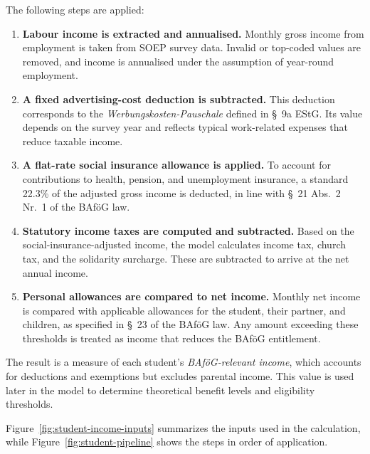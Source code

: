 \medskip
\noindent
The following steps are applied:

\begin{enumerate}
  \item \textbf{Labour income is extracted and annualised.}  
  Monthly gross income from employment is taken from SOEP survey data. Invalid or top-coded values are removed, and income is annualised under the assumption of year-round employment.

  \item \textbf{A fixed advertising-cost deduction is subtracted.}  
  This deduction corresponds to the \emph{Wer\-bungskosten-Pauschale} defined in §~9a EStG. Its value depends on the survey year and reflects typical work-related expenses that reduce taxable income.

  \item \textbf{A flat-rate social insurance allowance is applied.}  
  To account for contributions to health, pension, and unemployment insurance, a standard 22.3\% of the adjusted gross income is deducted, in line with §~21 Abs.~2 Nr.~1 of the BAföG law.

  \item \textbf{Statutory income taxes are computed and subtracted.}  
  Based on the social-insurance-adjusted income, the model calculates income tax, church tax, and the solidarity surcharge. These are subtracted to arrive at the net annual income.

  \item \textbf{Personal allowances are compared to net income.}  
  Monthly net income is compared with applicable allowances for the student, their partner, and children, as specified in §~23 of the BAföG law. Any amount exceeding these thresholds is treated as income that reduces the BAföG entitlement.
\end{enumerate}

\medskip
\noindent
The result is a measure of each student’s \emph{BAföG-relevant income}, which accounts for deductions and exemptions but excludes parental income. This value is used later in the model to determine theoretical benefit levels and eligibility thresholds.

\medskip
\noindent
Figure~\ref{fig:student-income-inputs} summarizes the inputs used in the calculation, while Figure~\ref{fig:student-pipeline} shows the steps in order of application.




